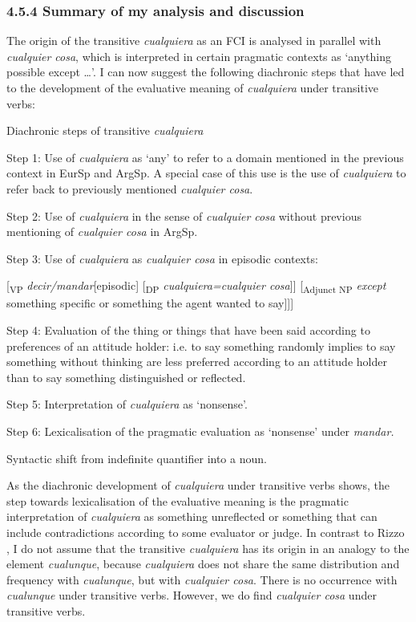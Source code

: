 \documentclass[output=paper]{langscibook}
\begin{document}
\subsubsection{\textbf{4.5.4} \textbf{Summary} \textbf{of} \textbf{my} \textbf{analysis} \textbf{and} \textbf{discussion}}

The origin of the transitive \textit{cualquiera} as an FCI is analysed in parallel with \textit{cualquier cosa}, which is interpreted in certain pragmatic contexts as ‘anything possible except …’. I can now suggest the following diachronic steps that have led to the development of the evaluative meaning of \textit{cualquiera} under transitive verbs:

  Diachronic steps of transitive \textit{cualquiera}

  Step 1:   Use of \textit{cualquiera} as ‘any’ to refer to a domain mentioned in the previous context in EurSp and ArgSp. A special case of this use is the use of \textit{cualquiera} to refer back to previously mentioned \textit{cualquier cosa}.

  Step 2:  Use of \textit{cualquiera} in the sense of \textit{cualquier cosa} without previous mentioning of \textit{cualquier cosa} in ArgSp.

  Step 3:  Use of \textit{cualquiera} as \textit{cualquier cosa} in episodic contexts: 

[\textsubscript{VP} \textit{decir/mandar}[episodic] [\textsubscript{DP} \textit{cualquiera=cualquier cosa}]] [\textsubscript{Adjunct NP} \textit{except} something specific or something the agent wanted to say]]]

  Step 4:  Evaluation of the thing or things that have been said according to preferences of an attitude holder: i.e. to say something randomly implies to say something without thinking are less preferred according to an attitude holder than to say something distinguished or reflected.

  Step 5:  Interpretation of \textit{cualquiera} as ‘nonsense’. 

  Step 6:  Lexicalisation of the pragmatic evaluation as ‘nonsense’ under \textit{mandar.} 

Syntactic shift from indefinite quantifier into a noun.

As the diachronic development of \textit{cualquiera} under transitive verbs shows, the step towards lexicalisation of the evaluative meaning is the pragmatic interpretation of \textit{cualquiera} as something unreflected or something that can include contradictions according to some evaluator or judge. In contrast to Rizzo \citet{Salierno2013}, I do not assume that the transitive \textit{cualquiera} has its origin in an analogy to the element \textit{cualunque}, because \textit{cualquiera} does not share the same distribution and frequency with \textit{cualunque}, but with \textit{cualquier cosa}. There is no occurrence with \textit{cualunque} under transitive verbs. However, we do find \textit{cualquier cosa} under transitive verbs.
\end{document}
